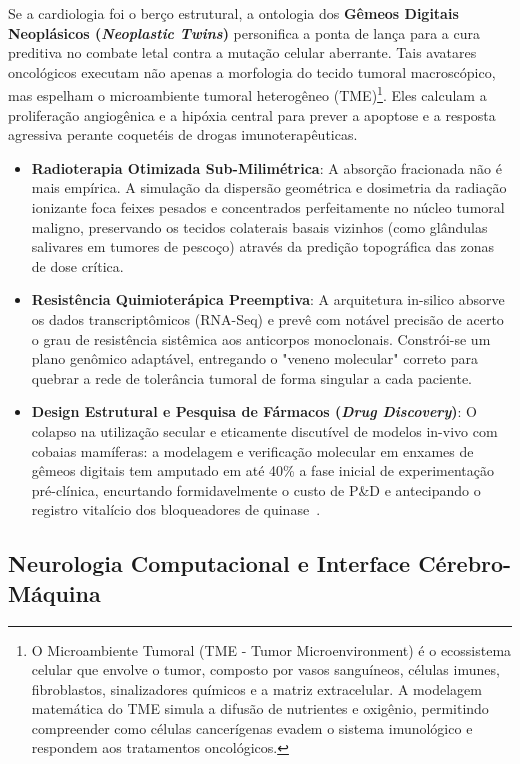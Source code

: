 Se a cardiologia foi o berço estrutural, a ontologia dos \textbf{Gêmeos Digitais Neoplásicos (\textit{Neoplastic Twins})} personifica a ponta de lança para a cura preditiva no combate letal contra a mutação celular aberrante. Tais avatares oncológicos executam não apenas a morfologia do tecido tumoral macroscópico, mas espelham o microambiente tumoral heterogêneo (TME)\footnote{O Microambiente Tumoral (TME - Tumor Microenvironment) é o ecossistema celular que envolve o tumor, composto por vasos sanguíneos, células imunes, fibroblastos, sinalizadores químicos e a matriz extracelular. A modelagem matemática do TME simula a difusão de nutrientes e oxigênio, permitindo compreender como células cancerígenas evadem o sistema imunológico e respondem aos tratamentos oncológicos.}. Eles calculam a proliferação angiogênica e a hipóxia central para prever a apoptose e a resposta agressiva perante coquetéis de drogas imunoterapêuticas.

\begin{itemize}
    \item \textbf{Radioterapia Otimizada Sub-Milimétrica}: A absorção fracionada não é mais empírica. A simulação da dispersão geométrica e dosimetria da radiação ionizante foca feixes pesados e concentrados perfeitamente no núcleo tumoral maligno, preservando os tecidos colaterais basais vizinhos (como glândulas salivares em tumores de pescoço) através da predição topográfica das zonas de dose crítica.
    \item \textbf{Resistência Quimioterápica Preemptiva}: A arquitetura in-silico absorve os dados transcriptômicos (RNA-Seq) e prevê com notável precisão de acerto o grau de resistência sistêmica aos anticorpos monoclonais. Constrói-se um plano genômico adaptável, entregando o "veneno molecular" correto para quebrar a rede de tolerância tumoral de forma singular a cada paciente.
    \item \textbf{Design Estrutural e Pesquisa de Fármacos (\textit{Drug Discovery})}: O colapso na utilização secular e eticamente discutível de modelos in-vivo com cobaias mamíferas: a modelagem e verificação molecular em enxames de gêmeos digitais tem amputado em até 40\% a fase inicial de experimentação pré-clínica, encurtando formidavelmente o custo de P\&D e antecipando o registro vitalício dos bloqueadores de quinase~\cite{menon2026digital}.
\end{itemize}

\subsection{Neurologia Computacional e Interface Cérebro-Máquina}

